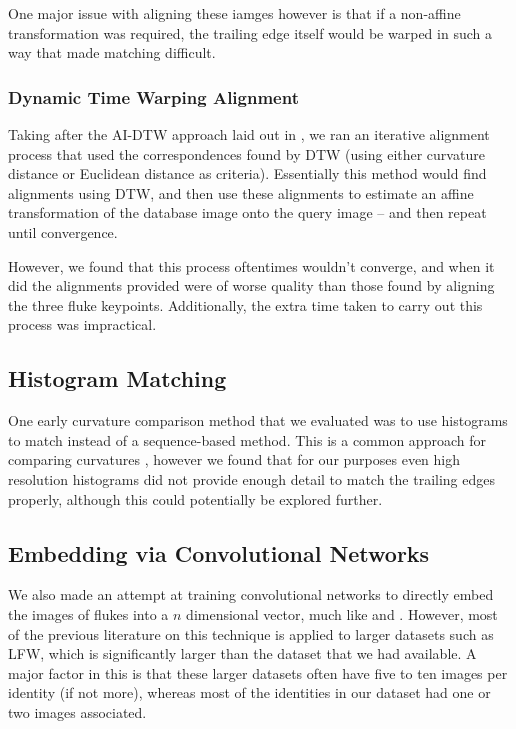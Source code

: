 One major issue with aligning these iamges however is that if a non-affine transformation was required, the trailing edge itself would be warped in such a way that made matching difficult.

\subsubsection{Dynamic Time Warping Alignment}

Taking after the AI-DTW approach laid out in \cite{qiao2006affine}, we ran an iterative alignment process that used the correspondences found by DTW (using either curvature distance or Euclidean distance as criteria).
Essentially this method would find alignments using DTW, and then use these alignments to estimate an affine transformation of the database image onto the query image -- and then repeat until convergence.

However, we found that this process oftentimes wouldn't converge, and when it did the alignments provided were of worse quality than those found by aligning the three fluke keypoints.
Additionally, the extra time taken to carry out this process was impractical.

\subsection{Histogram Matching}

One early curvature comparison method that we evaluated was to use histograms to match instead of a sequence-based method.
This is a common approach for comparing curvatures \cite{kumar2012leafsnap}, however we found that for our purposes even high resolution histograms did not provide enough detail to match the trailing edges properly, although this could potentially be explored further.

\subsection{Embedding via Convolutional Networks}

We also made an attempt at training convolutional networks to directly embed the images of flukes into a $n$ dimensional vector, much like \cite{schroff2015facenet} and \cite{parkhi2015deep}.
However, most of the previous literature on this technique is applied to larger datasets such as LFW\cite{huang2007labeled}, which is significantly larger than the dataset that we had available.
A major factor in this is that these larger datasets often have five to ten images per identity (if not more), whereas most of the identities in our dataset had one or two images associated.

